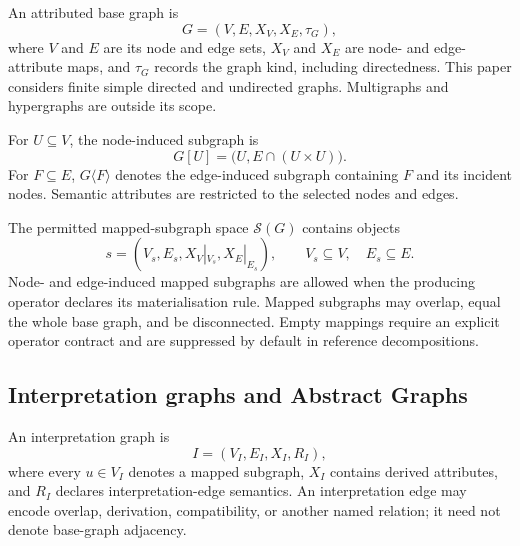 \begin{definition}
An attributed base graph is
\begin{equation}
  G=(V,E,X_V,X_E,\tau_G),
\end{equation}
where \(V\) and \(E\) are its node and edge sets, \(X_V\) and \(X_E\) are
node- and edge-attribute maps, and \(\tau_G\) records the graph kind, including
directedness. This paper considers finite simple directed and undirected
graphs. Multigraphs and hypergraphs are outside its scope.
\end{definition}

For \(U\subseteq V\), the node-induced subgraph is
\begin{equation}
  G[U]=\bigl(U,E\cap(U\times U)\bigr).
\end{equation}
For \(F\subseteq E\), \(G\langle F\rangle\) denotes the edge-induced subgraph
containing \(F\) and its incident nodes. Semantic attributes are restricted to
the selected nodes and edges.

\begin{definition}
The permitted mapped-subgraph space \(\mathcal{S}(G)\) contains objects
\begin{equation}
  s=(V_s,E_s,X_V|_{V_s},X_E|_{E_s}),
  \qquad V_s\subseteq V,\quad E_s\subseteq E.
\end{equation}
Node- and edge-induced mapped subgraphs are allowed when the producing operator
declares its materialisation rule. Mapped subgraphs may overlap, equal the
whole base graph, and be disconnected. Empty mappings require an explicit
operator contract and are suppressed by default in reference decompositions.
\end{definition}

\subsection{Interpretation graphs and Abstract Graphs}

\begin{definition}
An interpretation graph is
\begin{equation}
  I=(V_I,E_I,X_I,R_I),
\end{equation}
where every \(u\in V_I\) denotes a mapped subgraph, \(X_I\) contains derived
attributes, and \(R_I\) declares interpretation-edge semantics. An
interpretation edge may encode overlap, derivation, compatibility, or another
named relation; it need not denote base-graph adjacency.
\end{definition}

